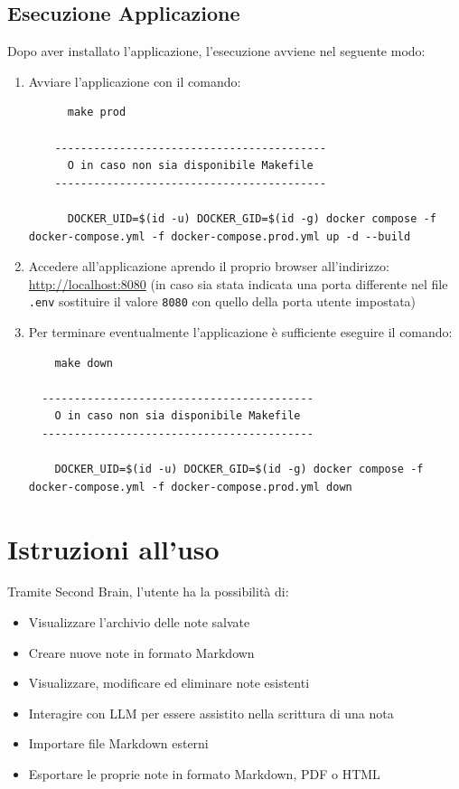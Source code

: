 \documentclass[a4paper,10pt]{article}
\begin{document}
\subsection{Esecuzione Applicazione}
Dopo aver installato l'applicazione, l'esecuzione avviene nel seguente modo:
\begin{enumerate}
  \item Avviare l'applicazione con il comando:

    \begin{lstlisting}
      make prod    

    ------------------------------------------
      O in caso non sia disponibile Makefile
    ------------------------------------------
    
      DOCKER_UID=$(id -u) DOCKER_GID=$(id -g) docker compose -f docker-compose.yml -f docker-compose.prod.yml up -d --build
    \end{lstlisting}

    
  \item Accedere all'applicazione aprendo il proprio browser all'indirizzo: \href{http://localhost:8080}{http://localhost:8080} (in caso sia stata indicata una porta differente nel file \texttt{.env} sostituire il valore \texttt{8080} con quello della porta utente impostata)

  \item Per terminare eventualmente l'applicazione è sufficiente eseguire il comando:
  
  \begin{lstlisting}
    make down

  ------------------------------------------
    O in caso non sia disponibile Makefile
  ------------------------------------------
    
    DOCKER_UID=$(id -u) DOCKER_GID=$(id -g) docker compose -f docker-compose.yml -f docker-compose.prod.yml down
  \end{lstlisting}

\end{enumerate} 

\newpage

\section{Istruzioni all'uso}
Tramite Second Brain, l'utente ha la possibilità di:
\begin{itemize}
    \item Visualizzare l'archivio delle note salvate
    \item Creare nuove note in formato Markdown
    \item Visualizzare, modificare ed eliminare note esistenti
    \item Interagire con LLM per essere assistito nella scrittura di una nota
    \item Importare file Markdown esterni
    \item Esportare le proprie note in formato Markdown, PDF o HTML
\end{itemize}
\end{document}
